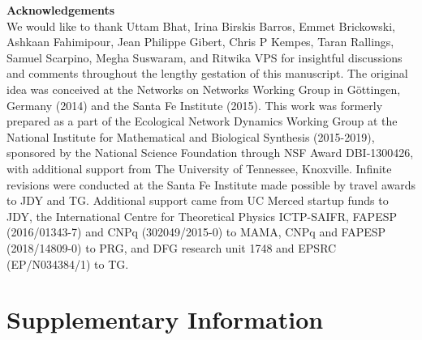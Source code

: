 \documentclass[twocolumn,preprintnumbers,amsmath,amssymb,superscriptaddress]{revtex4}
\newcommand{\beginsupplement}{%
        \clearpage
        \setcounter{table}{0}
        \renewcommand{\thetable}{S\arabic{table}}%
        \setcounter{figure}{0}
        \renewcommand{\thefigure}{S\arabic{figure}}%
        \setcounter{equation}{0}
        \renewcommand{\theequation}{S\arabic{equation}}
     }
\begin{document}
\vspace{0mm}
\noindent \textbf{Acknowledgements}\\
  \footnotesize{
  We would like to thank
  Uttam Bhat,
  Irina Birskis Barros,
  Emmet Brickowski,
  Ashkaan Fahimipour,
  Jean Philippe Gibert,
  Chris P Kempes,
  Taran Rallings,
  Samuel Scarpino,
  Megha Suswaram,
  and Ritwika VPS 
  for insightful discussions and comments throughout the lengthy gestation of this manuscript.
  The original idea was conceived at the Networks on Networks Working Group in G\"ottingen, Germany (2014) and the Santa Fe Institute (2015).
  This work was formerly prepared as a part of the Ecological Network Dynamics Working Group at the National Institute for Mathematical and Biological Synthesis (2015-2019), sponsored by the National Science Foundation through NSF Award DBI-1300426, with additional support from The University of Tennessee, Knoxville.
  Infinite revisions were conducted at the Santa Fe Institute made possible by travel awards to JDY and TG.
  Additional support came from UC Merced startup funds to JDY, the International Centre for Theoretical Physics ICTP-SAIFR, FAPESP (2016/01343-7) and CNPq (302049/2015-0) to MAMA, CNPq and FAPESP (2018/14809-0) to PRG, and DFG research unit 1748 and EPSRC (EP/N034384/1) to TG.
  }
\clearpage

\clearpage


\beginsupplement


\section*{Supplementary Information}

% 
\end{document}
